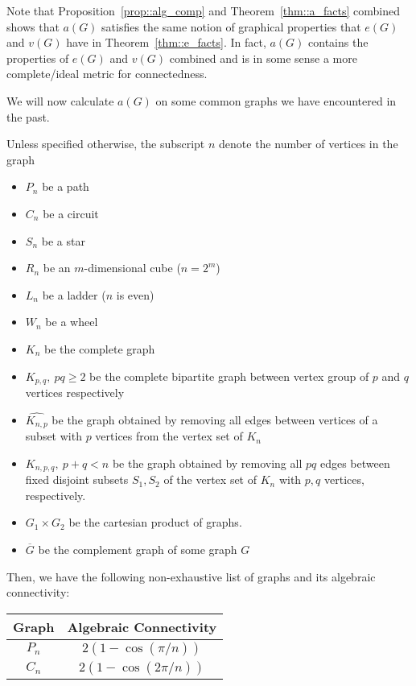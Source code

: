 \documentclass{article}
\begin{document}
\begin{remark}
    Note that Proposition~\ref{prop::alg_comp} and Theorem~\ref{thm::a_facts} combined shows that $a(G)$ satisfies the same notion of graphical properties that $e(G)$ and $v(G)$ have in Theorem~\ref{thm::e_facts}. In fact, $a(G)$ contains the properties of $e(G)$ and $v(G)$ combined and is in some sense a more complete/ideal metric for connectedness.
\end{remark}

We will now calculate $a(G)$ on some common graphs we have encountered in the past.

\begin{theorem}
Unless specified otherwise, the subscript $n$ denote the number of vertices in the graph
\begin{itemize}
    \item $P_n$ be a path
    \item $C_n$ be a circuit
    \item $S_n$ be a star
    \item $R_n$ be an $m$-dimensional cube ($n = 2^m$)
    \item $L_n$ be a ladder ($n$ is even)
    \item $W_n$ be a wheel
    \item $K_n$ be the complete graph
    \item $K_{p, q},\ pq \geq 2$ be the complete bipartite graph between vertex group of $p$ and $q$ vertices respectively
    \item $\hat{K_{n, p}}$ be the graph obtained by removing all edges between vertices of a subset with $p$ vertices from the vertex set of $K_n$
    \item $K_{n, p, q},\ p + q < n$ be the graph obtained by removing all $pq$ edges between fixed disjoint subsets $S_1, S_2$ of the vertex set of $K_n$ with $p, q$ vertices, respectively.  
    \item $G_1 \times G_2$ be the cartesian product of graphs.
    \item $\overline{G}$ be the complement graph of some graph $G$
\end{itemize}
    Then, we have the following non-exhaustive list of graphs and its algebraic connectivity:
    \begin{center}
\begin{tabular}{||c|| c||} 
 \hline
 Graph & Algebraic Connectivity \\ [0.5ex] 
 \hline\hline
  $P_n$ & $2(1 - \cos(\pi/n))$ \\ 
 $C_n$ & $2(1 - \cos(2\pi/n))$ \\ 

\end{tabular}
\end{center}
\end{theorem}
\end{document}
